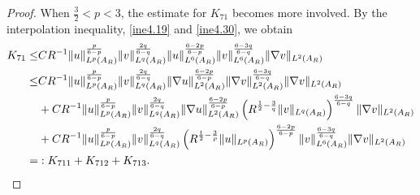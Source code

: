 \documentclass[10pt,a4paper]{amsart}
\begin{document}
\begin{proof}
When $\frac{3}{2}<p<3$, the estimate for $K_{71}$ becomes more involved. By the interpolation inequality, \eqref{ine4.19} and \eqref{ine4.30}, we obtain
\begin{align}\label{ine4.37}
	K_{71} \leq& C R^{-1} \|u\|_{L^p(A_R)}^{\frac{p}{6-p}}\|v\|_{L^q(A_R)}^{\frac{2q}{6-q}} \|u\|_{L^6(A_R)}^{\frac{6-2p}{6-p}}\|v\|_{L^6(A_R)}^{\frac{6-3q}{6-q}}  \|\nabla v\|_{L^2(A_R)}\notag\\
	\leq &C R^{-1} \|u\|_{L^p(A_R)}^{\frac{p}{6-p}}\|v\|_{L^q(A_R)}^{\frac{2q}{6-q}}\|\nabla u\|_{L^2(A_R)}^{\frac{6-2p}{6-p}}\|\nabla v\|_{L^2(A_R)}^{\frac{6-3q}{6-q}}\|\nabla v\|_{L^2(A_R)}\notag\\
&+C R^{-1} \|u\|_{L^p(A_R)}^{\frac{p}{6-p}}\|v\|_{L^q(A_R)}^{\frac{2q}{6-q}}\|\nabla u\|_{L^2(A_R)}^{\frac{6-2p}{6-p}}\left(R^{\frac{1}{2}-\frac{3}{q}} \|v\|_{L^q(A_R)}\right)^{\frac{6-3q}{6-q}}\|\nabla v\|_{L^2(A_R)}\\
&+C R^{-1} \|u\|_{L^p(A_R)}^{\frac{p}{6-p}}\|v\|_{L^q(A_R)}^{\frac{2q}{6-q}}\left(R^{\frac{1}{2}-\frac{3}{p}} \|u\|_{L^p(A_R)}\right)^{\frac{6-2p}{6-p}}
\|v\|_{L^6(A_R)}^{\frac{6-3q}{6-q}}\|\nabla v\|_{L^2(A_R)}\notag\\
=&:K_{711} + K_{712} + K_{713}.\notag
\end{align}



\end{proof}
\end{document}
